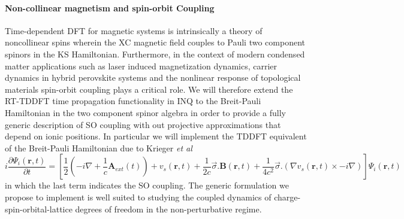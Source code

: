 

\paragraph{Non-collinear magnetism and spin-orbit Coupling} Time-dependent DFT for magnetic systems is intrinsically a theory of noncollinear spins wherein the XC magnetic field couples to Pauli two component spinors in the KS Hamiltonian. Furthermore, in the context of modern condensed matter applications such as laser induced magnetization dynamics, carrier dynamics in hybrid perovskite systems and the nonlinear response of topological materials spin-orbit coupling plays a critical role. We will therefore extend the RT-TDDFT time propagation functionality in \textsc{INQ} to the Breit-Pauli Hamiltonian in the two component spinor algebra in order to provide a fully generic description of SO coupling with out projective approximations that depend on ionic positions. In particular we will implement the TDDFT equivalent of the Breit-Pauli Hamiltonian due to Krieger \textit{et al} 
\begin{equation*}
i\frac{\partial\Psi_i(\textbf{r},t)}{\partial t} = [ \frac{1}{2} ( -i\nabla + \frac{1}{c}\textbf{A}_{ext} (t) )  + v_s(\textbf{r},t)  + \frac{1}{2c} \overrightarrow{\sigma}.\textbf{B}(\textbf{r},t)  + \frac{1}{4c^2}\overrightarrow{\sigma}.(\nabla v_s(\textbf{r},t) \times -i\nabla )] \Psi_i(\textbf{r},t)
\end{equation*}
in which the last term indicates the SO coupling. The generic formulation we propose to implement is well suited to studying the coupled dynamics of charge-spin-orbital-lattice degrees of freedom in the non-perturbative regime.  
 
